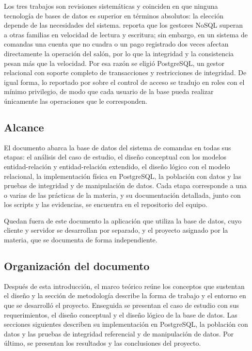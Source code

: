 Los tres trabajos son revisiones sistemáticas y coinciden en que ninguna tecnología de bases de datos es superior en términos absolutos: la elección depende de las necesidades del sistema. \textcite{taipalus2024} reporta que los gestores NoSQL superan a otras familias en velocidad de lectura y escritura; sin embargo, en un sistema de comandas una cuenta que no cuadra o un pago registrado dos veces afectan directamente la operación del salón, por lo que la integridad y la consistencia pesan más que la velocidad. Por esa razón se eligió PostgreSQL, un gestor relacional con soporte completo de transacciones y restricciones de integridad. De igual forma, lo reportado por \textcite{machuca2022} sobre el control de acceso se tradujo en roles con el mínimo privilegio, de modo que cada usuario de la base pueda realizar únicamente las operaciones que le corresponden.

\subsection{Alcance}

El documento abarca la base de datos del sistema de comandas en todas sus etapas: el análisis del caso de estudio, el diseño conceptual con los modelos entidad-relación y entidad-relación extendido, el diseño lógico con el modelo relacional, la implementación física en PostgreSQL, la población con datos y las pruebas de integridad y de manipulación de datos. Cada etapa corresponde a una o varias de las prácticas de la materia, y su documentación detallada, junto con los scripts y las evidencias, se encuentra en el repositorio del equipo.

Quedan fuera de este documento la aplicación que utiliza la base de datos, cuyo cliente y servidor se desarrollan por separado, y el proyecto asignado por la materia, que se documenta de forma independiente.

\subsection{Organización del documento}

Después de esta introducción, el marco teórico reúne los conceptos que sustentan el diseño y la sección de metodología describe la forma de trabajo y el entorno en que se desarrolló el proyecto. Enseguida se presentan el caso de estudio con sus requerimientos, el diseño conceptual y el diseño lógico de la base de datos. Las secciones siguientes describen su implementación en PostgreSQL, la población con datos y las pruebas de integridad referencial y de manipulación de datos. Por último, se presentan los resultados y las conclusiones del proyecto.
